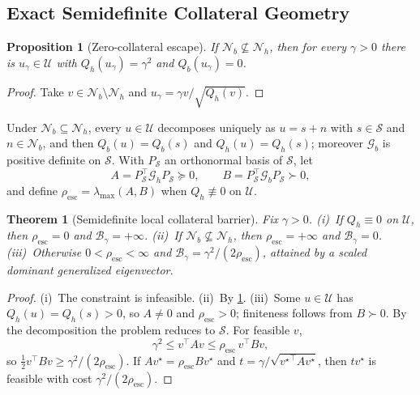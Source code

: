 \documentclass[11pt]{article}
\newtheorem{proposition}{Proposition}
\newtheorem{theorem}{Theorem}
\newcommand{\Gh}{\mathcal{G}_{h}}
\newcommand{\Gb}{\mathcal{G}_{b}}
\newcommand{\Resc}{\rho_{\mathrm{esc}}}
\newcommand{\Barrier}{\mathcal{B}}
\newcommand{\U}{\mathcal{U}}
\newcommand{\Nb}{\mathcal{N}_{b}}
\newcommand{\Nh}{\mathcal{N}_{h}}
\begin{document}
\subsection{Exact Semidefinite Collateral Geometry}
\label{app:cbg_exact_geometry}

\begin{proposition}[Zero-collateral escape]
\label{prop:zero}
If $\Nb\not\subseteq\Nh$, then for every $\gamma>0$ there is $u_\gamma\in\U$ with $Q_h(u_\gamma)=\gamma^2$ and $Q_b(u_\gamma)=0$.
\end{proposition}
\begin{proof}
Take $v\in\Nb\setminus\Nh$ and $u_\gamma=\gamma v/\sqrt{Q_h(v)}$.
\end{proof}

Under $\Nb\subseteq\Nh$, every $u\in\U$ decomposes uniquely as $u=s+n$ with $s\in\mathcal S$ and $n\in\Nb$, and then $Q_b(u)=Q_b(s)$ and $Q_h(u)=Q_h(s)$; moreover $\Gb$ is positive definite on $\mathcal S$. With $P_{\mathcal S}$ an orthonormal basis of $\mathcal S$, let
\begin{equation*}
A=P_{\mathcal S}^\top\Gh P_{\mathcal S}\succeq0,\qquad B=P_{\mathcal S}^\top\Gb P_{\mathcal S}\succ0,
\end{equation*}
and define $\Resc=\lambda_{\max}(A,B)$ when $Q_h\not\equiv0$ on $\U$.

\begin{theorem}[Semidefinite local collateral barrier]
\label{thm:barrier}
Fix $\gamma>0$.
(i)~If $Q_h\equiv0$ on $\U$, then $\Resc=0$ and $\Barrier_\gamma=+\infty$.
(ii)~If $\Nb\not\subseteq\Nh$, then $\Resc=+\infty$ and $\Barrier_\gamma=0$.
(iii)~Otherwise $0<\Resc<\infty$ and $\Barrier_\gamma=\gamma^2/(2\Resc)$, attained by a scaled dominant generalized eigenvector.
\end{theorem}
\begin{proof}
(i)~The constraint is infeasible. (ii)~By \cref{prop:zero}. (iii)~Some $u\in\U$ has $Q_h(u)=Q_h(s)>0$, so $A\ne0$ and $\Resc>0$; finiteness follows from $B\succ0$. By the decomposition the problem reduces to $\mathcal S$. For feasible $v$,
\begin{equation*}
\gamma^2\le v^\top Av\le\Resc\,v^\top Bv,
\end{equation*}
so $\tfrac12v^\top Bv\ge\gamma^2/(2\Resc)$. If $Av^\star=\Resc Bv^\star$ and $t=\gamma/\sqrt{{v^\star}^\top Av^\star}$, then $tv^\star$ is feasible with cost $\gamma^2/(2\Resc)$.
\end{proof}
\end{document}
